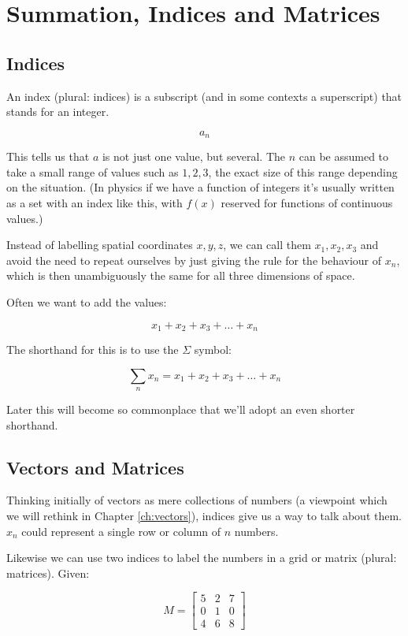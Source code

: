 \chapter{Summation, Indices and Matrices}

\section{Indices}

An index (plural: indices) is a subscript (and in some contexts a superscript) that stands for an integer.

$$a_n$$

This tells us that $a$ is not just one value, but several. The $n$ can be assumed to take a small range of values such as $1, 2, 3$, the exact size of this range depending on the situation. (In physics if we have a function of integers it's usually written as a set with an index like this, with $f(x)$ reserved for functions of continuous values.)

Instead of labelling spatial coordinates $x, y, z$, we can call them $x_1, x_2, x_3$ and avoid the need to repeat ourselves by just giving the rule for the behaviour of $x_n$, which is then unambiguously the same for all three dimensions of space.

Often we want to add the values:

$$x_1 + x_2 + x_3 + \dots + x_n$$

The shorthand for this is to use the $\Sigma$ symbol:

$$\sum_n{x_n} = x_1 + x_2 + x_3 + \dots + x_n$$

Later this will become so commonplace that we'll adopt an even shorter shorthand.

\section{Vectors and Matrices}

Thinking initially of vectors as mere collections of numbers (a viewpoint which we will rethink in Chapter \ref{ch:vectors}), indices give us a way to talk about them. $x_n$ could represent a single row or column of $n$ numbers.

Likewise we can use two indices to label the numbers in a grid or matrix (plural: matrices). Given:

$$
M = \begin{bmatrix}
5 & 2 & 7 \\
0 & 1 & 0 \\
4 & 6 & 8
\end{bmatrix}
$$

